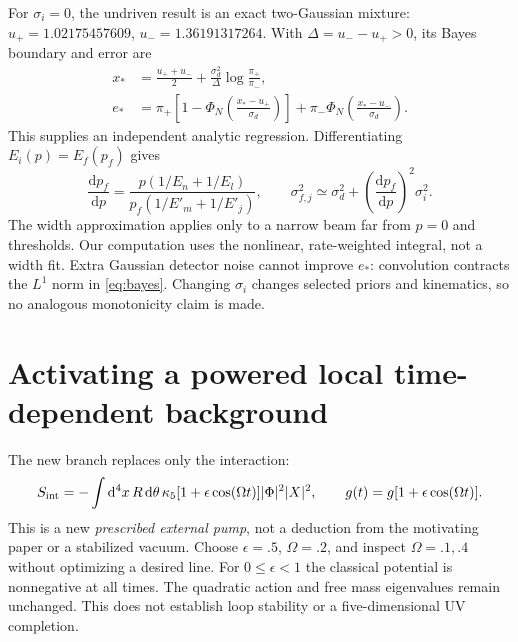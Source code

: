 \documentclass[11pt,a4paper]{article}
\newcommand{\dd}{\mathrm d}
\begin{document}
For $\sigma_i=0$, the undriven result is an exact two-Gaussian
mixture: $u_+=1.02175457609$, $u_-=1.36191317264$.
With $\Delta=u_--u_+>0$, its Bayes boundary and error are
\begin{align}
 x_*&=\frac{u_++u_-}{2}
       +\frac{\sigma_d^2}{\Delta}\log\frac{\pi_+}{\pi_-},\\
 e_*&=\pi_+\left[1-\Phi_{\!N}\left(\frac{x_*-u_+}{\sigma_d}\right)\right]
       +\pi_-\Phi_{\!N}\left(\frac{x_*-u_-}{\sigma_d}\right).
\end{align}
This supplies an independent analytic regression.
Differentiating $E_i(p)=E_f(p_f)$ gives
\begin{equation}\label{eq:slope}
 \frac{\dd p_f}{\dd p}
 =\frac{p(1/E_n+1/E_l)}{p_f(1/E'_m+1/E'_j)},\qquad
 \sigma_{f,j}^2\simeq\sigma_d^2+
 \left(\frac{\dd p_f}{\dd p}\right)^2\sigma_i^2 .
\end{equation}
The width approximation applies only to a narrow beam far from $p=0$
and thresholds. Our computation uses the nonlinear, rate-weighted
integral, not a width fit. Extra Gaussian detector noise cannot improve
$e_*$: convolution contracts the $L^1$ norm in \eqref{eq:bayes}.
Changing $\sigma_i$ changes selected priors and kinematics, so no
analogous monotonicity claim is made.

\section{Activating a powered local time-dependent background}
The new branch replaces only the interaction:
\begin{equation}\label{eq:drive}
 S_{\rm int}=-\int\dd^4x\,R\,\dd\theta\,
 \kappa_5[1+\epsilon\cos(\Omega t)]|\Phi|^2|X|^2,\qquad
 g(t)=g[1+\epsilon\cos(\Omega t)] .
\end{equation}
This is a new \emph{prescribed external pump}, not a deduction from
the motivating paper or a stabilized vacuum.
Choose $\epsilon=.5$, $\Omega=.2$, and inspect $\Omega=.1,.4$
without optimizing a desired line. For $0\leq\epsilon<1$ the
classical potential is nonnegative at all times. The quadratic action
and free mass eigenvalues remain unchanged. This does not establish
loop stability or a five-dimensional UV completion.
\end{document}

